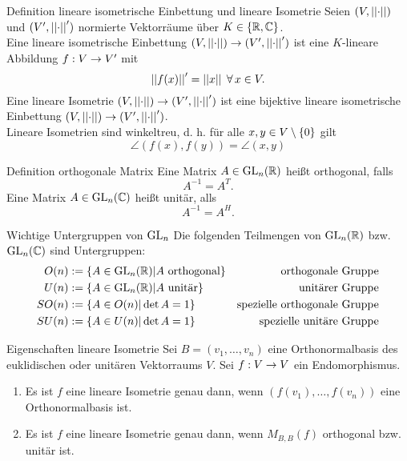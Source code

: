 \documentclass[main.tex]{subfiles}
\begin{document}
\begin{karte}{Definition lineare isometrische Einbettung und lineare Isometrie}
    Seien \((V, \left|\left|\cdot\right|\right|)\) und \((V', \left|\left|\cdot\right|\right|')\) normierte Vektorräume über 
    \(K \in \{\mathbb{R}, \mathbb{C}\}\).\\
    Eine lineare isometrische Einbettung \((V, \left|\left|\cdot\right|\right|) \rightarrow (V', \left|\left|\cdot\right|\right|')\)
    ist eine \(K\)-lineare Abbildung \(f : V \rightarrow V'\) mit
    \[ \norm{f(x)}' = \norm{x} \; \forall x \in V. \]
    Eine lineare Isometrie \((V, \left|\left|\cdot\right|\right|) \rightarrow (V', \left|\left|\cdot\right|\right|')\) ist eine
    bijektive lineare isometrische Einbettung \((V, \left|\left|\cdot\right|\right|) \rightarrow (V', \left|\left|\cdot\right|\right|')\).\\
    Lineare Isometrien sind winkeltreu, d. h. für alle \(x, y \in V \setminus \{0\}\) gilt
    \[ \angle (f(x), f(y)) = \angle (x,y) \]
\end{karte}

\begin{karte}{Definition orthogonale Matrix}
    Eine Matrix \(A \in \operatorname{GL}_n(\mathbb{R})\) heißt orthogonal, falls
    \[ A^{-1} = A^T. \]
    Eine Matrix \(A \in \operatorname{GL}_n(\mathbb{C})\) heißt unitär, alls
    \[A^{-1} = A^H.\]
\end{karte}

\begin{karte}{Wichtige Untergruppen von \(\operatorname{GL}_n\)}
    Die folgenden Teilmengen von \(\operatorname{GL}_n(\mathbb{R})\) bzw. \(\operatorname{GL}_n(\mathbb{C})\) sind Untergruppen:
    \begin{align*}
        O(n) &:= \{A \in \operatorname{GL}_n(\mathbb{R}) \vert A \text{ orthogonal}\} &\text{orthogonale Gruppe}\\
        U(n) &:= \{A \in \operatorname{GL}_n(\mathbb{R}) \vert A \text{ unitär}\} &\text{unitärer Gruppe}\\
        SO(n) &:= \{A \in O(n) \vert \det A = 1\} &\text{spezielle orthogonale Gruppe}\\
        SU(n) &:= \{A \in U(n) \vert \det A = 1\} &\text{spezielle unitäre Gruppe}
    \end{align*}
\end{karte}

\begin{karte}{Eigenschaften lineare Isometrie}
    Sei \(B = (v_1, \ldots, v_n)\) eine Orthonormalbasis des euklidischen oder unitären 
    Vektorraums \(V\). Sei \(f : V \rightarrow V\) ein Endomorphismus.
    \begin{enumerate}
        \item Es ist \(f\) eine lineare Isometrie genau dann, wenn \((f(v_1), \ldots, f(v_n))\)
        eine Orthonormalbasis ist.
        \item Es ist \(f\) eine lineare Isometrie genau dann, wenn \(M_{B,B}(f)\) orthogonal 
        bzw. unitär ist.
    \end{enumerate}
\end{karte}
\end{document}
